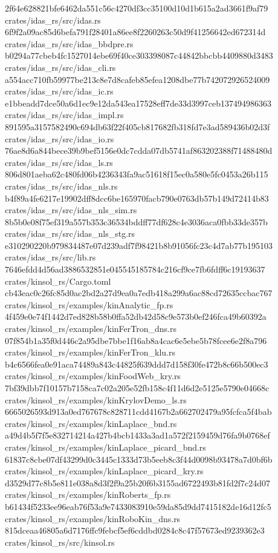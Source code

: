 \documentclass[
  10pt,
]{article}
\newenvironment{Shaded}{}{}
\newcommand{\NormalTok}[1]{#1}
\begin{document}
\begin{Shaded}
\begin{Highlighting}[]
\NormalTok{2f64e628821bfe6462da551c56c4270df3cc35100d10d1b615a2ad3661f9af79  crates/idas\_rs/src/idas.rs}
\NormalTok{6f9f2a09ac85d6befa791f28401a86ee8f2260263c50d9f41256642ed672314d  crates/idas\_rs/src/idas\_bbdpre.rs}
\NormalTok{b0294a77cbeb4fc1527014ebe69f40ce303398087c44842bbcbb4409880d3483  crates/idas\_rs/src/idas\_cli.rs}
\NormalTok{a554acc710fb59977be213c8e7d8cafeb85efea1208dbe77b742072926524009  crates/idas\_rs/src/idas\_ic.rs}
\NormalTok{e1bbeadd7dce50a6d1ec9e12da543ea17528eff7de33d3997ceb137494986363  crates/idas\_rs/src/idas\_impl.rs}
\NormalTok{891595a3157582490c694db63f22f405cb817682fb318fd7e3ad589436b02d3f  crates/idas\_rs/src/idas\_io.rs}
\NormalTok{76ae8d6a844bece39b9bef5156e0dc7cdda07db5741af863202388f71488480d  crates/idas\_rs/src/idas\_ls.rs}
\NormalTok{806d801aeba62c480fd06b4236343fa9ac51618f15ec0a580e5fc0453a26b115  crates/idas\_rs/src/idas\_nls.rs}
\NormalTok{b4f89a4fe6217e19902dff8dcc6be165970facb790e0763db57b149d72414b83  crates/idas\_rs/src/idas\_nls\_sim.rs}
\NormalTok{8b5b0e08f75ef319a557b353c36534bddff77df628c4e3036aca0fbb33de357b  crates/idas\_rs/src/idas\_nls\_stg.rs}
\NormalTok{e310290220b979834487e07d239adf7f98421b8b91056fc23c4d7ab77b195103  crates/idas\_rs/src/lib.rs}
\NormalTok{7646efdd4d56ad3886532851e045545185784c216cf9ce7fb6fdff6c19193637  crates/kinsol\_rs/Cargo.toml}
\NormalTok{cb43eac0c26fc85d0ac2bd2a27d9ea0a7edb418a299a6ac88cd72635ccbac767  crates/kinsol\_rs/examples/kinAnalytic\_fp.rs}
\NormalTok{4f459e0e74f1442d7ed828b58b0ffa52db42d58c9e573b0ef246fca49b60392a  crates/kinsol\_rs/examples/kinFerTron\_dns.rs}
\NormalTok{07f854b1a35f0d446c2a95dbe7bbe1f16ab8a4cac6e5ebe5b78fcee6e2f8a796  crates/kinsol\_rs/examples/kinFerTron\_klu.rs}
\NormalTok{b4c6566fea0e91aca74489a843c44825f639ddd7d158f30fe472b8c66b500ec3  crates/kinsol\_rs/examples/kinFoodWeb\_kry.rs}
\NormalTok{7bf39dbb7f10157b7158ca7c02a205e52fb158c4f11d6d2e5125e5790e04668c  crates/kinsol\_rs/examples/kinKrylovDemo\_ls.rs}
\NormalTok{6665026593d913a0ed767678c828711cdd4167b2a662702479a95fcfca5f4bab  crates/kinsol\_rs/examples/kinLaplace\_bnd.rs}
\NormalTok{a49d4b5f7f5e832714214a427b4bcb1433a3ad1a572f2159459d76fa9b0768ef  crates/kinsol\_rs/examples/kinLaplace\_picard\_bnd.rs}
\NormalTok{61837c8cbe07df43299d0c3445c1333d73b5eeb8c3f44d0098b93478a7d0bf6b  crates/kinsol\_rs/examples/kinLaplace\_picard\_kry.rs}
\NormalTok{d3529d77c8b5e811e038a8d3f2f9a25b20f6b3155ad6722493b81fd2f7c24d07  crates/kinsol\_rs/examples/kinRoberts\_fp.rs}
\NormalTok{b61434f5233ee96eab76f53a9e7433083910e59da85d9dd7415182de16d12fc5  crates/kinsol\_rs/examples/kinRoboKin\_dns.rs}
\NormalTok{815dceaa46805a6d7176ffc9febcf5ef6cddbd0284c8c47f57673ed9239362e3  crates/kinsol\_rs/src/kinsol.rs}

\end{Highlighting}
\end{Shaded}
\end{document}
